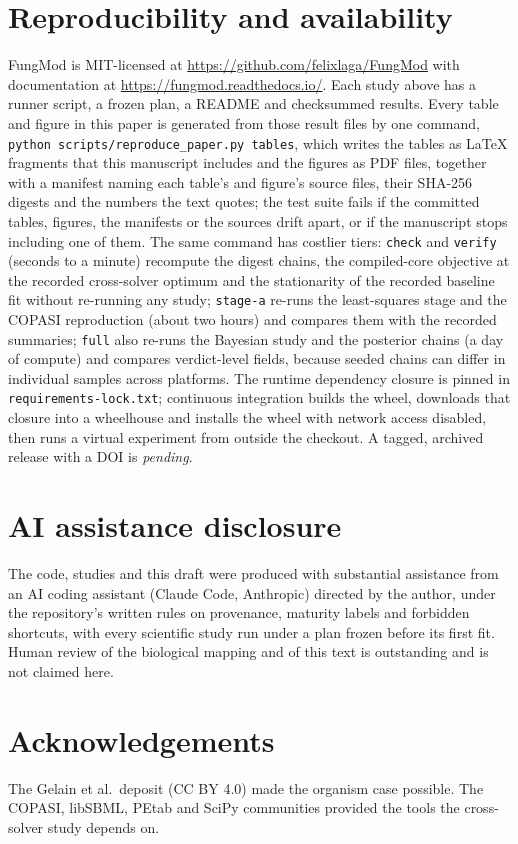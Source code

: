 \documentclass[11pt,a4paper]{article}
\begin{document}
\section{Reproducibility and availability}

FungMod is MIT-licensed at \url{https://github.com/felixlaga/FungMod} with
documentation at \url{https://fungmod.readthedocs.io/}. Each study above has
a runner script, a frozen plan, a README and checksummed results. Every
table and figure in this paper is generated from those result files by one
command, \texttt{python scripts/reproduce\_paper.py tables}, which writes
the tables as \LaTeX{} fragments that this manuscript includes and the
figures as PDF files, together with a manifest naming each table's and
figure's source files, their SHA-256 digests and the numbers the text
quotes; the test suite fails if the committed tables, figures, the
manifests or the sources drift apart, or if the manuscript stops including
one of them. The same command has costlier tiers: \texttt{check} and
\texttt{verify} (seconds to a minute) recompute the digest chains, the
compiled-core objective at the recorded cross-solver optimum and the
stationarity of the recorded baseline fit without re-running any study;
\texttt{stage-a} re-runs the least-squares stage and the COPASI
reproduction (about two hours) and compares them with the recorded
summaries; \texttt{full} also re-runs the Bayesian study and the posterior
chains (a day of compute) and compares verdict-level fields, because seeded
chains can differ in individual samples across platforms. The runtime
dependency closure is pinned in \texttt{requirements-lock.txt}; continuous
integration builds the wheel, downloads that closure into a wheelhouse and
installs the wheel with network access disabled, then runs a virtual
experiment from outside the checkout. A tagged, archived release with a DOI
is \emph{pending}.

\section{AI assistance disclosure}

The code, studies and this draft were produced with substantial assistance
from an AI coding assistant (Claude Code, Anthropic) directed by the
author, under the repository's written rules on provenance, maturity
labels and forbidden shortcuts, with every scientific study run under a
plan frozen before its first fit. Human review of the biological mapping
and of this text is outstanding and is not claimed here.

\section*{Acknowledgements}

The Gelain et al.\ deposit (CC BY 4.0) made the organism case possible. The
COPASI, libSBML, PEtab and SciPy communities provided the tools the
cross-solver study depends on.


\end{document}
